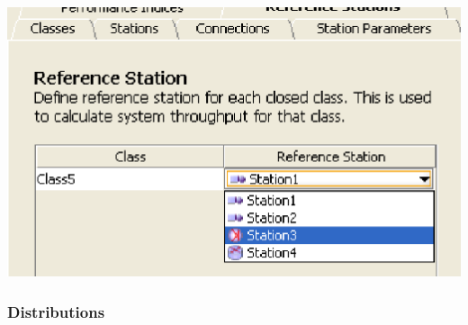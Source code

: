 \begin{center}
\includegraphics[scale=.5]{img/jsim/reference_closed1.eps}
\end{center}

\subsubsection{Distributions}
\label{sec:Distributions}

